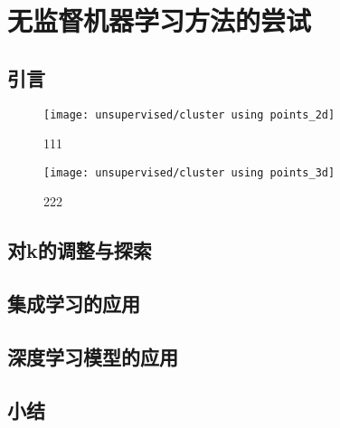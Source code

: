 \chapter{无监督机器学习方法的尝试}
\section{引言}
\begin{figure}[htbp]
    \centering
    \texttt{[image: unsupervised/cluster using points\_2d]}
    \caption[]{\label{fig:cluster2d}111}
\end{figure}
\begin{figure}[htbp]
    \centering
    \texttt{[image: unsupervised/cluster using points\_3d]}
    \caption[]{\label{fig:cluster3d}222}
\end{figure}
\section{对k的调整与探索}
\section{集成学习的应用}
\section{深度学习模型的应用}
\section{小结}
